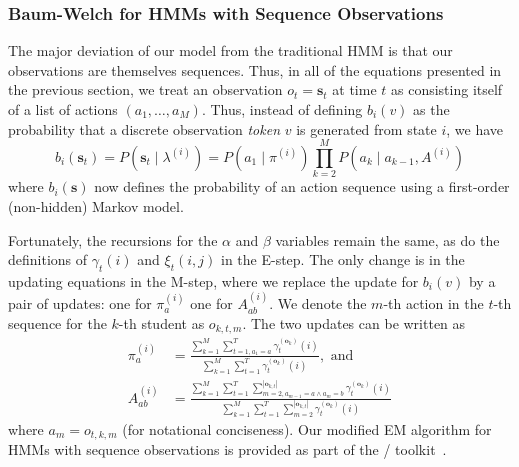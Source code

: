 \subsubsection{Baum-Welch for HMMs with Sequence Observations}
The major deviation of our model from the traditional HMM is that our
observations are themselves sequences. Thus, in all of the equations
presented in the previous section, we treat an observation $o_t =
\mathbf{s}_t$ at time $t$ as consisting itself of a list of actions $(a_1,
\ldots, a_M)$. Thus, instead of defining $b_i(v)$ as the probability that a
discrete observation \emph{token} $v$ is generated from state $i$, we have
\begin{equation}
  b_i(\mathbf{s}_t) = P(\mathbf{s}_t \mid \lambda^{(i)})
  = P(a_1 \mid \pi^{(i)}) \prod_{k=2}^M P(a_k \mid
  a_{k-1}, A^{(i)})
\end{equation}
where $b_i(\mathbf{s})$ now defines the probability of an action sequence
using a first-order (non-hidden) Markov model.

Fortunately, the recursions for the $\alpha$ and $\beta$ variables remain
the same, as do the definitions of $\gamma_t(i)$ and $\xi_t(i,j)$ in the
E-step. The only change is in the updating equations in the M-step,
where we replace the update for $b_i(v)$ by a pair of updates: one for
$\pi^{(i)}_a$ one for $A^{(i)}_{ab}$. We denote the $m$-th action in the
$t$-th sequence for the $k$-th student as $o_{k,t,m}$. The two updates can
be written as
\begin{align}
  \pi^{(i)}_{a}
  &= \frac{\sum_{k=1}^M \sum_{t=1,a_1 = a}^T \gamma^{(\mathbf{o}_k)}_t(i)}
  {\sum_{k=1}^M \sum_{t=1}^T \gamma^{(\mathbf{o}_k)}_t(i)}, \text{ and }\\
  A^{(i)}_{ab}
  &= \frac{\sum_{k=1}^M \sum_{t=1}^T
  \sum_{m=2,a_{m-1}=a \land a_m = b}^{|\mathbf{o}_{k,t}|}
  \gamma^{(\mathbf{o}_k)}_t(i)}
  {\sum_{k=1}^M \sum_{t=1}^T \sum_{m=2}^{|\mathbf{o}_{k,t}|}
  \gamma^{(\mathbf{o}_k)}_t(i)}
\end{align}
where $a_m = o_{t,k,m}$ (for notational conciseness). Our modified EM
algorithm for HMMs with sequence observations is provided as part of the
\meta/ toolkit~\cite{Massung:2016:ACL}.
